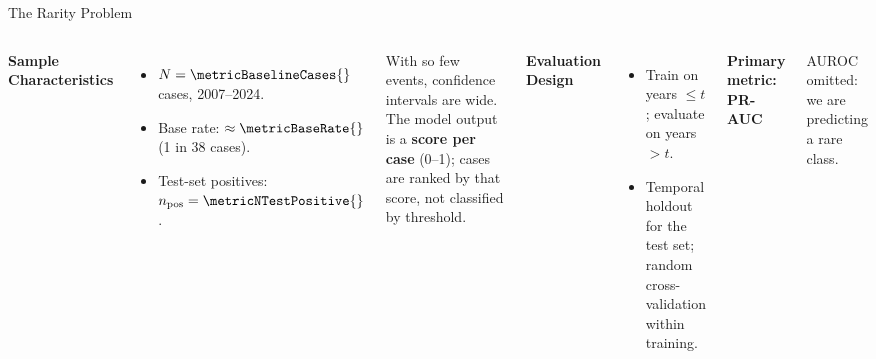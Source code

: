 \documentclass[10pt, aspectratio=169]{beamer}
\begin{document}
\begin{frame}{The Rarity Problem}
    \begin{columns}
        \textbf{Sample Characteristics}
        \begin{itemize}
            \item $N = \metricBaselineCases{}$ cases, 2007--2024.
            \item Base rate: $\approx\metricBaseRate{}$ (1 in 38 cases).
            \item Test-set positives: $n_{\text{pos}} = \metricNTestPositive{}$.
        \end{itemize}
        \vspace{0.8em}
        With so few events, confidence intervals are wide. The model output is a \textbf{score per case} (0--1); cases are ranked by that score, not classified by threshold.

        \textbf{Evaluation Design}
        \begin{itemize}
            \item Train on years $\leq t$; evaluate on years $> t$.
            \item Temporal holdout for the test set; random cross-validation within training.
        \end{itemize}
        \vspace{0.8em}
        \textbf{Primary metric: PR-AUC}

        \small AUROC omitted: we are predicting a rare class.
    \end{columns}
\end{frame}
\end{document}
